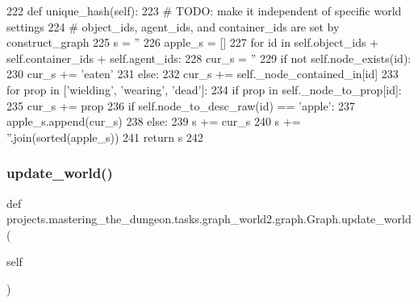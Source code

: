 \begin{DoxyCode}
222     \textcolor{keyword}{def }unique\_hash(self):
223         \textcolor{comment}{# TODO: make it independent of specific world settings}
224         \textcolor{comment}{# object\_ids, agent\_ids, and container\_ids are set by construct\_graph}
225         s = \textcolor{stringliteral}{''}
226         apple\_s = []
227         \textcolor{keywordflow}{for} id \textcolor{keywordflow}{in} self.object\_ids + self.container\_ids + self.agent\_ids:
228             cur\_s = \textcolor{stringliteral}{''}
229             \textcolor{keywordflow}{if} \textcolor{keywordflow}{not} self.node\_exists(id):
230                 cur\_s += \textcolor{stringliteral}{'eaten'}
231             \textcolor{keywordflow}{else}:
232                 cur\_s += self.\_node\_contained\_in[id]
233                 \textcolor{keywordflow}{for} prop \textcolor{keywordflow}{in} [\textcolor{stringliteral}{'wielding'}, \textcolor{stringliteral}{'wearing'}, \textcolor{stringliteral}{'dead'}]:
234                     \textcolor{keywordflow}{if} prop \textcolor{keywordflow}{in} self.\_node\_to\_prop[id]:
235                         cur\_s += prop
236             \textcolor{keywordflow}{if} self.node\_to\_desc\_raw(id) == \textcolor{stringliteral}{'apple'}:
237                 apple\_s.append(cur\_s)
238             \textcolor{keywordflow}{else}:
239                 s += cur\_s
240         s += \textcolor{stringliteral}{''}.join(sorted(apple\_s))
241         \textcolor{keywordflow}{return} s
242 
\end{DoxyCode}
\mbox{\label{classprojects_1_1mastering__the__dungeon_1_1tasks_1_1graph__world2_1_1graph_1_1Graph_a23324301e21091e84366d23c626d8125}} 
\subsubsection{\texorpdfstring{update\+\_\+world()}{update\_world()}}
{\footnotesize\ttfamily def projects.\+mastering\+\_\+the\+\_\+dungeon.\+tasks.\+graph\+\_\+world2.\+graph.\+Graph.\+update\+\_\+world (\begin{DoxyParamCaption}\item[{}]{self }\end{DoxyParamCaption})}



